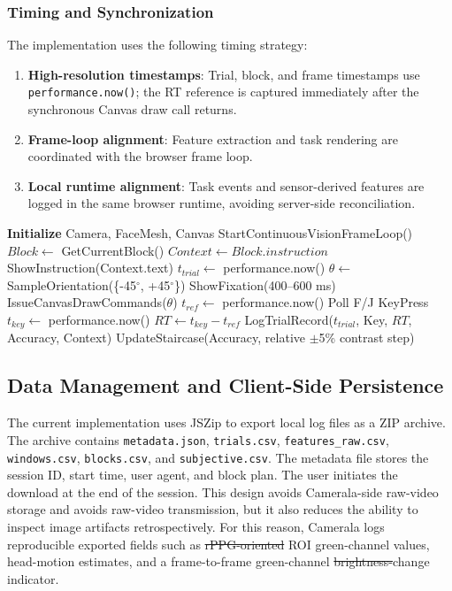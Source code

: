 \documentclass[dvipdfmx]{ehis}
\makeatletter
\providecommand{\DIFadd}[1]{{\protect\color{blue}\uwave{#1}}} %
\providecommand{\DIFdel}[1]{{\protect\color{red}\sout{#1}}} %
\providecommand{\DIFaddbegin}{} %
\providecommand{\DIFaddend}{} %
\providecommand{\DIFdelbegin}{} %
\providecommand{\DIFdelend}{} %
\providecommand{\DIFscaledelfig}{0.5}
\newlength{\DIFdelgraphicswidth} %
\newlength{\DIFdelgraphicsheight} %
\providecommand{\DIFaddincludegraphics}[2][]{{\color{blue}\fbox{\DIFOincludegraphics[#1]{#2}}}} %
\providecommand{\DIFdelincludegraphics}[2][]{%
\sbox{\DIFdelgraphicsbox}{\DIFOincludegraphics[#1]{#2}}%
\settoboxwidth{\DIFdelgraphicswidth}{\DIFdelgraphicsbox} %
\settoboxtotalheight{\DIFdelgraphicsheight}{\DIFdelgraphicsbox} %
\scalebox{\DIFscaledelfig}{%
\parbox[b]{\DIFdelgraphicswidth}{\usebox{\DIFdelgraphicsbox}\\[-\baselineskip] \rule{\DIFdelgraphicswidth}{0em}}\llap{\resizebox{\DIFdelgraphicswidth}{\DIFdelgraphicsheight}{%
\setlength{\unitlength}{\DIFdelgraphicswidth}%
\begin{picture}(1,1)%
\thicklines\linethickness{2pt} %
{\color[rgb]{1,0,0}\put(0,0){\framebox(1,1){}}}%
{\color[rgb]{1,0,0}\put(0,0){\line( 1,1){1}}}%
{\color[rgb]{1,0,0}\put(0,1){\line(1,-1){1}}}%
\end{picture}%
}\hspace*{3pt}}} %
} %
\DeclareRobustCommand{\DIFaddbegin}{\DIFOaddbegin \let\includegraphics\DIFaddincludegraphics} %
\DeclareRobustCommand{\DIFaddend}{\DIFOaddend \let\includegraphics\DIFOincludegraphics} %
\DeclareRobustCommand{\DIFdelbegin}{\DIFOdelbegin \let\includegraphics\DIFdelincludegraphics} %
\DeclareRobustCommand{\DIFdelend}{\DIFOaddend \let\includegraphics\DIFOincludegraphics} %
\let\sout@orig\sout %
\renewcommand{\sout}[1]{\ifmmode\text{\sout@orig{\ensuremath{#1}}}\else\sout@orig{#1}\fi} %
\makeatother
\begin{document}
\subsubsection{Timing and Synchronization}
The implementation uses the following timing strategy:
\begin{enumerate}
    \item \textbf{High-resolution timestamps}: Trial, block, and frame timestamps use \texttt{performance.now()}; the RT reference is captured immediately after the synchronous Canvas draw call returns.
    \item \textbf{Frame-loop alignment}: Feature extraction and task rendering are coordinated with the browser frame loop.
    \item \textbf{Local runtime alignment}: Task events and sensor-derived features are logged in the same browser runtime, avoiding server-side reconciliation.
\end{enumerate}

\begin{algorithm}
\caption{Camerala Task Loop (Simplified)}
\begin{algorithmic}
\STATE \textbf{Initialize} Camera, FaceMesh, Canvas
\STATE StartContinuousVisionFrameLoop()
    \STATE $Block \leftarrow$ GetCurrentBlock()
    \STATE $Context \leftarrow Block.instruction$
    \STATE ShowInstruction(Context.text)
        \STATE $t_{trial} \leftarrow$ performance.now()
        \STATE $\theta \leftarrow$ SampleOrientation(\{-45$^\circ$, +45$^\circ$\})
        \STATE ShowFixation(400--600 ms)
        \STATE IssueCanvasDrawCommands($\theta$)
        \STATE $t_{ref} \leftarrow$ performance.now()
            \STATE Poll F/J KeyPress
        \ENDWHILE
        \STATE $t_{key} \leftarrow$ performance.now()
        \STATE $RT \leftarrow t_{key} - t_{ref}$
        \STATE LogTrialRecord($t_{trial}$, Key, $RT$, Accuracy, Context)
        \STATE UpdateStaircase(Accuracy, relative $\pm$5\% contrast step)
    \ENDFOR
\ENDWHILE
\end{algorithmic}
\end{algorithm}

\subsection{Data Management and Client-Side Persistence}
The current implementation uses JSZip to export local log files as a ZIP archive.
The archive contains \texttt{metadata.json}, \texttt{trials.csv}, \texttt{features\_raw.csv}, \texttt{windows.csv}, \texttt{blocks.csv}, and \texttt{subjective.csv}.
The metadata file stores the session ID, start time, user agent, and block plan.
The user initiates the download at the end of the session.
This design avoids Camerala-side raw-video storage and avoids raw-video transmission, but it also reduces the ability to inspect image artifacts retrospectively.
For this reason, Camerala logs reproducible exported fields such as \DIFdelbegin \DIFdel{rPPG-oriented }\DIFdelend \DIFaddbegin \DIFadd{facial }\DIFaddend ROI green-channel values, head-motion estimates, and a frame-to-frame green-channel \DIFdelbegin \DIFdel{brightness-}\DIFdelend change indicator.
\end{document}
